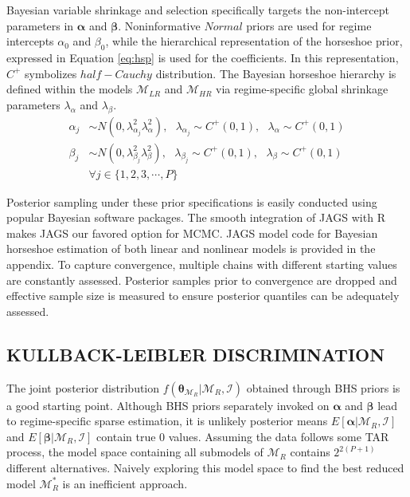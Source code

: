 Bayesian variable shrinkage and selection specifically targets the non-intercept parameters in $\bm{\alpha}$ and $\bm{\beta}$. Noninformative $Normal$ priors are used for regime intercepts $\alpha_0$ and $\beta_0$, while the hierarchical representation of the horseshoe prior, expressed in Equation \ref{eq:hsp} is used for the coefficients. In this representation, $C^+$ symbolizes $half-Cauchy$ distribution. The Bayesian horseshoe hierarchy is defined within the models $\mathcal{M}_{LR}$ and $\mathcal{M}_{HR}$ via  regime-specific global shrinkage parameters $\lambda_\alpha$ and $\lambda_\beta$. 
\begin{equation}
\label{eq:hsp}
\begin{split}
 	\alpha_j &\sim N(0,\lambda^2_{\alpha_j}\lambda_{\alpha}^2), \textrm{ } \lambda_{\alpha_j}\sim C^+(0,1), \textrm{ } \lambda_\alpha \sim C^+(0,1) \\
 	\beta_j & \sim N(0,\lambda^2_{\beta_j}\lambda_{\beta}^2), \textrm{ } \lambda_{\beta_j}\sim C^+(0,1), \textrm{ } \lambda_\beta \sim C^+(0,1)\\
 	& \forall j \in \{1,2,3,\cdots,P\}
\end{split}
\end{equation}

Posterior sampling under these prior specifications is easily conducted using popular Bayesian software packages. The smooth integration of JAGS \cite{Plummer2003} with R makes JAGS our favored option for MCMC. JAGS model code for Bayesian horseshoe estimation of both linear and nonlinear models is provided in the appendix. To capture convergence, multiple chains with different starting values are constantly assessed. Posterior samples prior to convergence are dropped and effective sample size is measured to ensure posterior quantiles can be adequately assessed.

\subsection{KULLBACK-LEIBLER DISCRIMINATION}
The joint posterior distribution $f(\bm{\theta}_{\mathcal{M}_R}|\mathcal{M}_R,\mathcal{I})$ obtained through BHS priors is  a good starting point. Although BHS priors separately invoked on $\bm{\alpha}$ and $\bm{\beta}$ lead to regime-specific sparse estimation, it is unlikely posterior means $E[\bm{\alpha}|\mathcal{M}_R,\mathcal{I}]$ and $E[\bm{\beta}|\mathcal{M}_R,\mathcal{I}]$ contain true $0$ values.   Assuming the data follows some TAR process, the model space containing all submodels of $\mathcal{M}_R$ contains $2^{2(P+1)}$ different alternatives. Naively exploring this model space to find the best reduced model $\mathcal{M}^*_R$ is an inefficient approach.

